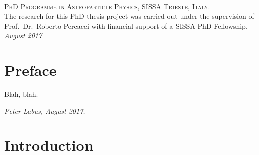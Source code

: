 \documentclass[11pt,draft]{book} %
\makeatletter
\def\cleardoublepage{\clearpage%
  \if@twoside
  \ifodd\c@page\else
  \vspace*{\fill}
  \hfill
  \begin{center}
    This page intentionally left blank.
  \end{center}
  \vspace{\fill}
  \thispagestyle{empty}
  \newpage
  \if@twocolumn\hbox{}\newpage\fi
  \fi
  \fi
}
\makeatother
\begin{document}



\newpage
~\vfill
\thispagestyle{empty}

\noindent \textsc{PhD Programme in Astroparticle Physics, SISSA Trieste, Italy.}\\

\noindent The research for this PhD thesis project was carried out
under the supervision of Prof.~Dr.~Roberto Percacci with financial support
of a SISSA PhD Fellowship.\\

\noindent \textit{August 2017} %


\chapter*{Preface}

Blah, blah.

\begin{flushright}
  \textit{Peter Labus, August 2017.}
\end{flushright}


\pagestyle{empty} %

\tableofcontents %


\pagestyle{fancy} %


\chapter*{Introduction}
\end{document}
